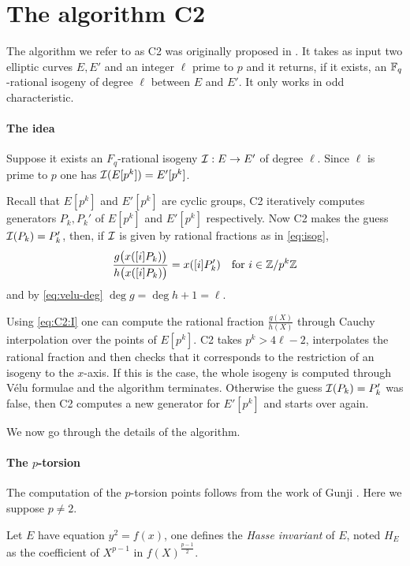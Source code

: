 \section{The algorithm C2}
\label{sec:C2}

The algorithm we refer to as C2 was originally proposed in
\cite{Cou96}. It takes as input two elliptic curves $E, E'$ and an
integer $\ell$ prime to $p$ and it returns, if it exists, an
$\mathbb{F}_q$-rational isogeny of degree $\ell$ between $E$ and $E'$. It only
works in odd characteristic.

\paragraph{The idea} Suppose it exists an $F_q$-rational isogeny
$\mathcal{I}:E\rightarrow E'$ of degree $\ell$. Since $\ell$ is prime to $p$
one has $\mathcal{I}(E[p^k]) = E'[p^k]$.

Recall that $E[p^k]$ and $E'[p^k]$ are cyclic groups, C2 iteratively
computes generators $P_k,P_k'$ of $E[p^k]$ and $E'[p^k]$
respectively. Now C2 makes the guess $\mathcal{I}(P_k) = P_k'$, then, if $\mathcal{I}$
is given by rational fractions as in \eqref{eq:isog},
\begin{equation}
  \label{eq:C2:I}
  \frac{g\bigl(x([i]P_k)\bigr)}{h\bigl(x([i]P_k)\bigr)} = x([i]P_k')
  \quad\text{for $i\in\mathbb{Z}/p^k\mathbb{Z}$} 
\end{equation}
and by \eqref{eq:velu-deg} $\deg g = \deg h + 1 = \ell$.

Using \eqref{eq:C2:I} one can compute the rational fraction
$\frac{g(X)}{h(X)}$ through Cauchy interpolation over the points of
$E[p^k]$. C2 takes $p^k > 4\ell - 2$, interpolates the rational
fraction and then checks that it corresponds to the restriction of an
isogeny to the $x$-axis. If this is the case, the whole isogeny is
computed through Vélu formulae and the algorithm terminates. Otherwise
the guess $\mathcal{I}(P_k) = P_k'$ was false, then C2 computes a new generator
for $E'[p^k]$ and starts over again.

We now go through the details of the algorithm.

\paragraph{The $p$-torsion}
The computation of the $p$-torsion points follows from the work of
Gunji \cite{Gun76}. Here we suppose $p\ne2$.

\begin{definition}
  \label{def:hasse}
  Let $E$ have equation $y^2 = f(x)$, one defines the \emph{Hasse
    invariant} of $E$, noted $H_E$ as the coefficient of $X^{p-1}$ in
  $f(X)^{\frac{p-1}{2}}$.
\end{definition}

